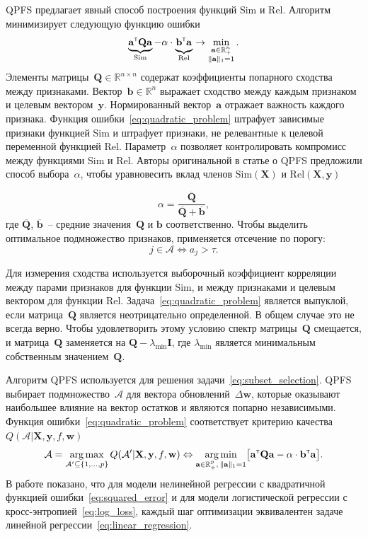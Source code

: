 \documentclass[a4paper,12pt]{article}
\theoremstyle{plain} %
\theoremstyle{definition} %
\theoremstyle{remark} %
\newcommand{\ba}{\mathbf{a}}
\newcommand{\bb}{\mathbf{b}}
\newcommand{\bw}{\mathbf{w}}
\newcommand{\by}{\mathbf{y}}
\newcommand{\cA}{\mathcal{A}}
\newcommand{\bQ}{\mathbf{Q}}
\newcommand{\bbR}{\mathbb{R}}
\newcommand{\bX}{\mathbf{X}}
\newcommand{\T}{{\text{\tiny\sffamily\upshape\mdseries T}}}
\newcommand{\argmin}{\mathop{\arg \min}\limits}
\newcommand{\argmax}{\mathop{\arg \max}\limits}
\begin{document}
	QPFS предлагает явный способ построения функций Sim и Rel. 
	Алгоритм минимизирует следующую функцию ошибки
	\begin{equation}
	\underbrace{\ba^{\T} \bQ \ba}_{\text{Sim}} - \alpha \cdot \underbrace{\vphantom{()} \mathbf{b}^{\T} \ba}_{\text{Rel}} \rightarrow \min_{\substack{\ba \in \bbR^n_+ \\ \|\ba\|_1=1}}.
	\label{eq:quadratic_problem}
	\end{equation}
	Элементы матрицы~$\bQ \in \bbR^{n \times n}$ содержат коэффициенты попарного сходства между признаками. 
	Вектор~$\mathbf{b} \in \bbR^n$ выражает сходство между каждым признаком и целевым вектором~$\by$.
	Нормированный вектор~$\ba$ отражает важность каждого признака. 
	Функция ошибки~\eqref{eq:quadratic_problem} штрафует зависимые признаки функцией Sim и штрафует признаки, не релевантные к целевой переменной функцией Rel. 
	Параметр~$\alpha$ позволяет контролировать компромисс между функциями Sim и Rel.
	Авторы оригинальной в статье о QPFS предложили способ выбора~$\alpha$, чтобы уравновесить вклад членов $\text{Sim}(\bX)$ и $\text{Rel}(\bX, \by)$
	
	\begin{equation*}
	\alpha = \frac{\overline{\bQ}}{\overline{\bQ} + \overline{\bb}},
	\end{equation*}
	где $\overline{\bQ}$, $\overline{\bb}$~-- средние значения~$\bQ$ и $\bb$ соответственно.
	Чтобы выделить оптимальное подмножество признаков, применяется отсечение по порогу:
	\[
	j \in \mathcal{A} \Leftrightarrow a_j > \tau.
	\]
	
	Для измерения сходства используется выборочный коэффициент корреляции между парами признаков для функции Sim, и между признаками и целевым вектором для функции Rel.
	Задача~\eqref{eq:quadratic_problem} является выпуклой, если матрица~$\bQ$ является неотрицательно определенной. В общем случае это не всегда верно. 
	Чтобы удовлетворить этому условию спектр матрицы~$\bQ$ смещается, и матрица~$\bQ$ заменяется на $\bQ - \lambda_{\text{min}} \mathbf{I}$, где $\lambda_{\text{min}} $ является минимальным собственным значением~$\bQ$.
	
	Алгоритм QPFS используется для решения задачи~\eqref{eq:subset_selection}.
	QPFS выбирает подмножество~$\cA$ для вектора обновлений~$ \Delta \bw$, которые оказывают наибольшее влияние на вектор остатков и являются попарно независимыми.
	Функция ошибки~\eqref{eq:quadratic_problem} соответствует критерию качества~$Q(\cA | \bX, \by, f, \bw)$
	\begin{equation}
	\cA = \argmax_{\cA' \subseteq \{1, \dots, p\}} Q(\cA' | \bX, \by, f, \bw) \Leftrightarrow \argmin_{\ba  \in \bbR^p_+, \, \|\ba\|_1=1} \bigl[\ba^{\T} \bQ \ba - \alpha \cdot \mathbf{b}^{\T} \ba \bigr].
	\end{equation}
	В работе показано, что для модели нелинейной регрессии с квадратичной функцией ошибки~\eqref{eq:squared_error} и для модели логистической регрессии с кросс-энтропией~\eqref{eq:log_loss}, каждый шаг оптимизации эквивалентен задаче линейной регрессии~\eqref{eq:linear_regression}.
\end{document}
